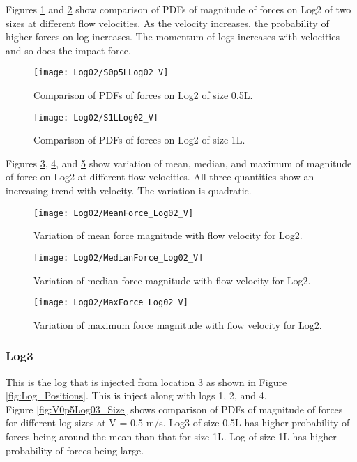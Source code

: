 \noindent Figures \ref{fig:S0p5LLog02_V} and \ref{fig:S1LLog02_V} show comparison of PDFs of magnitude of forces on Log2 of two sizes at different flow velocities. As the velocity increases, the probability of higher forces on log increases. The momentum of logs increases with velocities and so does the impact force.

\begin{figure}
\centering
\texttt{[image: Log02/S0p5LLog02\_V]}
\caption{\label{fig:S0p5LLog02_V}Comparison of PDFs of forces on Log2 of size 0.5L.}
\end{figure}
\begin{figure}
\centering
\texttt{[image: Log02/S1LLog02\_V]}
\caption{\label{fig:S1LLog02_V}Comparison of PDFs of forces on Log2 of size 1L.}
\end{figure}

\noindent Figures \ref{fig:MeanForce_Log02_V}, \ref{fig:MedianForce_Log02_V}, and \ref{fig:MaxForce_Log02_V} show variation of mean, median, and maximum of magnitude of force on Log2 at different flow velocities. All three quantities show an increasing trend with velocity. The variation is quadratic. 

\begin{figure}
\centering
\texttt{[image: Log02/MeanForce\_Log02\_V]}
\caption{\label{fig:MeanForce_Log02_V}Variation of mean force magnitude with flow velocity for Log2.}
\end{figure}
\begin{figure}
\centering
\texttt{[image: Log02/MedianForce\_Log02\_V]}
\caption{\label{fig:MedianForce_Log02_V}Variation of median force magnitude with flow velocity for Log2.}
\end{figure}
\begin{figure}
\centering
\texttt{[image: Log02/MaxForce\_Log02\_V]}
\caption{\label{fig:MaxForce_Log02_V}Variation of maximum force magnitude with flow velocity for Log2.}
\end{figure}

\FloatBarrier
\subsubsection{Log3}
This is the log that is injected from location 3 as shown in Figure \ref{fig:Log_Positions}. This is inject along with logs 1, 2, and 4.\\ 
Figure \ref{fig:V0p5Log03_Size} shows comparison of PDFs of magnitude of forces for different log sizes at V = 0.5 m/s. Log3 of size 0.5L has higher probability of forces being around the mean than that for size 1L. Log of size 1L has higher probability of forces being large.

